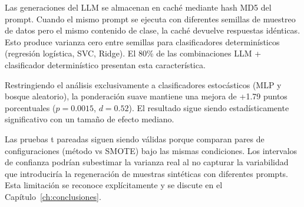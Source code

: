 

Las generaciones del LLM se almacenan en caché mediante hash MD5 del prompt. Cuando el mismo prompt se ejecuta con diferentes semillas de muestreo de datos pero el mismo contenido de clase, la caché devuelve respuestas idénticas. Esto produce varianza cero entre semillas para clasificadores determinísticos (regresión logística, SVC, Ridge). El 80\% de las combinaciones LLM + clasificador determinístico presentan esta característica.

Restringiendo el análisis exclusivamente a clasificadores estocásticos (MLP y bosque aleatorio), la ponderación suave mantiene una mejora de +1.79 puntos porcentuales ($p = 0.0015$, $d = 0.52$). El resultado sigue siendo estadísticamente significativo con un tamaño de efecto mediano.

Las pruebas t pareadas siguen siendo válidas porque comparan pares de configuraciones (método vs SMOTE) bajo las mismas condiciones. Los intervalos de confianza podrían subestimar la varianza real al no capturar la variabilidad que introduciría la regeneración de muestras sintéticas con diferentes prompts. Esta limitación se reconoce explícitamente y se discute en el Capítulo~\ref{ch:conclusiones}.
